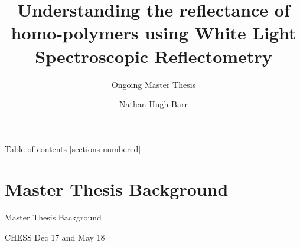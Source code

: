 \documentclass[10pt]{beamer}
\title{Understanding the reflectance of homo-polymers using White Light Spectroscopic Reflectometry}
\subtitle{Ongoing Master Thesis}
\date{}
\author{Nathan Hugh Barr}
\institute{Roskilde University}
\begin{document}
\maketitle

\begin{frame}{Table of contents}
  [sections numbered]
  \tableofcontents[hideallsubsections]
\end{frame}

	\section{Master Thesis Background}

	\begin{frame}{Master Thesis Background}

CHESS Dec 17 and May 18


\end{frame}
\end{document}
